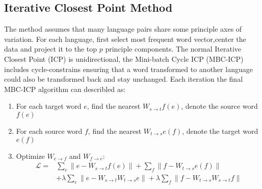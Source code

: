 \subsection{Iterative Closest Point Method}

The method assumes that many language pairs share some principle axes of variation. For each language, first select most frequent word vector,center the data and project it to the top ${p}$ principle components.
The normal Iterative Closest Point (ICP) is unidirectional, the Mini-batch Cycle ICP (MBC-ICP) includes cycle-constrains ensuring that a word transformed to another language could also be transformed back and stay unchanged. Each iteration the final MBC-ICP algorithm can describled as: 
 
\begin{enumerate}
	\item For each target word ${e}$, find the nearest ${W_{s\rightarrow t} f(e)}$, denote the source word ${f(e)}$
	\item For each source word ${f}$, find the nearest ${W_{t\rightarrow s} e(f)}$, denote the target word ${e(f)}$
	\item Optimize ${W_{e\rightarrow f}}$ and ${W_{f\rightarrow e}}$: 
	\begin{align*}
		\mathcal{L} = &  \sum_{e} {\lVert e - W_{s\rightarrow t} f(e)\rVert} + \sum_f {\rVert f - W_{t \rightarrow s} e(f)\rVert} \\ 
		& + \lambda {\sum_e}{\lVert e - W_{s\rightarrow t} W_{t\rightarrow s} e \rVert}  +  \lambda \sum_f {\lVert f - W_{t\rightarrow s} W_{s \rightarrow t} f \rVert}
	\end{align*}

\end{enumerate}
